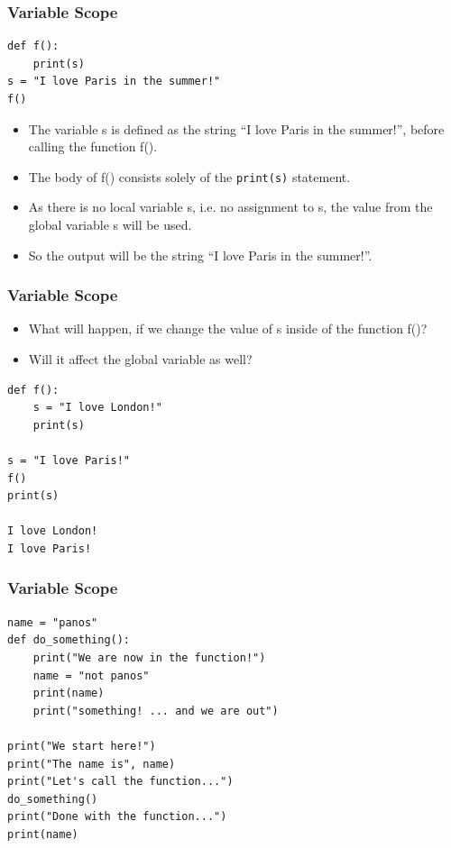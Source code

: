 \begin{frame}[fragile]\frametitle{Variable Scope}
\begin{lstlisting}
def f():
    print(s)
s = "I love Paris in the summer!"
f()
\end{lstlisting}

    \begin{itemize}
    \item The variable s is defined as the string ``I love Paris in the summer!'', before calling the function f().
    \item The body of f() consists solely of the \texttt{print(s)} statement.
    \item As there is no local variable s, i.e. no assignment to s, the value from the global variable s will be used.
    \item So the output will be the string ``I love Paris in the summer!''.
    \end{itemize}
\end{frame}

\begin{frame}[fragile]\frametitle{Variable Scope}

    \begin{itemize}
    \item What will happen, if we change the value of s inside of the function f()?
    \item  Will it affect the global variable as well?
    \end{itemize}
\begin{lstlisting}
def f():
    s = "I love London!"
    print(s)

s = "I love Paris!"
f()
print(s)

I love London!
I love Paris!
\end{lstlisting}

\end{frame}

\begin{frame}[fragile]\frametitle{Variable Scope}
\begin{lstlisting}
name = "panos"
def do_something():
    print("We are now in the function!")
    name = "not panos"
    print(name)
    print("something! ... and we are out")

print("We start here!")
print("The name is", name)
print("Let's call the function...")
do_something()
print("Done with the function...")
print(name)
\end{lstlisting}
\end{frame}

